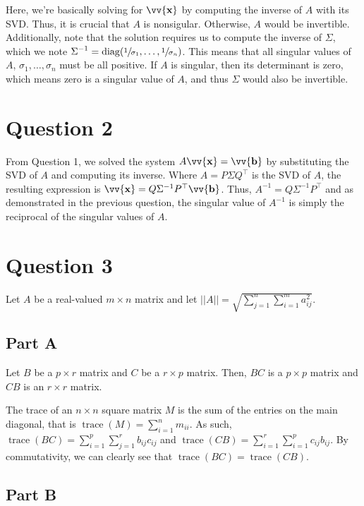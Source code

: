 \documentclass[12pt]{article}
\newcommand{\vect}[1]{\vv{\mathbf{#1}}}
\newcommand{\trace}{\operatorname{trace}}
\begin{document}
Here, we're basically solving for $\vect{x}$ by computing the inverse of $A$ with its SVD. Thus, it is crucial that $A$ is nonsigular. Otherwise, $A$ would be invertible. Additionally, note that the solution requires us to compute the inverse of $\Sigma$, which we note $\displaystyle \Sigma^{-1} = \operatorname{diag}(\sfrac{1}{\sigma_1},\ldots,\sfrac{1}{\sigma_n})$. This means that all singular values of $A$, $\sigma_1,\ldots,\sigma_n$ must be all positive. If $A$ is singular, then its determinant is zero, which means zero is a singular value of $A$, and thus $\Sigma$ would also be invertible.

\section*{Question 2}

From Question 1, we solved the system $A\vect{x}=\vect{b}$ by substituting the SVD of $A$ and computing its inverse. Where $A=P\Sigma Q^\top$ is the SVD of $A$, the resulting expression is $\vect{x} = Q\Sigma^{-1}P^\top\vect{b}$. Thus, $A^{-1}=Q\Sigma^{-1}P^\top$ and as demonstrated in the previous question, the singular value of $A^{-1}$ is simply the reciprocal of the singular values of $A$.

\section*{Question 3}

Let $A$ be a real-valued $m\times n$ matrix and let $||A||=\sqrt{\sum_{j=1}^n \sum_{i=1}^m a_{ij}^2}$.

\subsection*{Part A}

Let $B$ be a $p \times r$ matrix and $C$ be a $r \times p$ matrix. Then, $BC$ is a $p\times p$ matrix and $CB$ is an $r\times r$ matrix.

The trace of an $n\times n$ square matrix $M$ is the sum of the entries on the main diagonal, that is $\displaystyle\trace(M) = \sum_{i=1}^n m_{ii}$. As such, $\displaystyle\trace(BC) = \sum_{i=1}^p \sum_{j=1}^r b_{ij} c_{ij}$ and $\displaystyle\trace(CB) = \sum_{i=1}^r \sum_{i=1}^p c_{ij} b_{ij}$. By commutativity, we can clearly see that $\trace(BC)=\trace(CB)$.

\subsection*{Part B}
\end{document}
